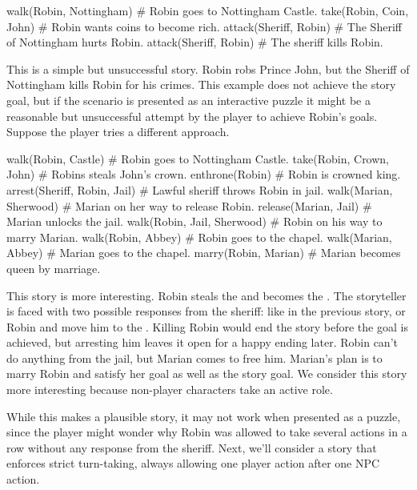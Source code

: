 \documentclass{nilreport}
\begin{document}
\begin{code}
walk(Robin, Nottingham) # Robin goes to Nottingham Castle.
take(Robin, Coin, John) # Robin wants coins to become rich.
attack(Sheriff, Robin)  # The Sheriff of Nottingham hurts Robin.
attack(Sheriff, Robin)  # The sheriff kills Robin.
\end{code}

This is a simple but unsuccessful story. Robin robs Prince John, but the Sheriff of Nottingham kills Robin for his crimes. This example does not achieve the story goal, but if the scenario is presented as an interactive puzzle it might be a reasonable but unsuccessful attempt by the player to achieve Robin's goals. Suppose the player tries a different approach.

\begin{code}
walk(Robin, Castle)          # Robin goes to Nottingham Castle.
take(Robin, Crown, John)     # Robins steals John's crown.
enthrone(Robin)              # Robin is crowned king.
arrest(Sheriff, Robin, Jail) # Lawful sheriff throws Robin in jail.
walk(Marian, Sherwood)       # Marian on her way to release Robin.
release(Marian, Jail)        # Marian unlocks the jail.
walk(Robin, Jail, Sherwood)  # Robin on his way to marry Marian.
walk(Robin, Abbey)           # Robin goes to the chapel.
walk(Marian, Abbey)          # Marian goes to the chapel.
marry(Robin, Marian)         # Marian becomes queen by marriage.
\end{code}

This story is more interesting. Robin steals the  and becomes the . The storyteller is faced with two possible responses from the sheriff:  like in the previous story, or  Robin and move him to the . Killing Robin would end the story before the goal is achieved, but arresting him leaves it open for a happy ending later. Robin can't do anything from the jail, but Marian comes to free him. Marian's plan is to marry Robin and satisfy her  goal as well as the story goal. We consider this story more interesting because non-player characters take an active role.

While this makes a plausible story, it may not work when presented as a puzzle, since the player might wonder why Robin was allowed to take several actions in a row without any response from the sheriff. Next, we'll consider a story that enforces strict turn-taking, always allowing one player action after one NPC action.
\end{document}
